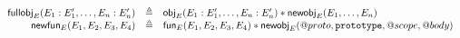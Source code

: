 \documentclass[a4paper]{article}
\begin{document}
%
%

\begin{displaymath}
  \begin{array}{rcl}
  \mathsf{fullobj}_{E}(E_1:E_1',\dots,E_n:E_n') &\triangleq& \mathsf{obj}_{E}(E_1:E_1',\dots,E_n:E_n') \mathbin{*} \mathsf{newobj}_{E}(E_1,\dots,E_n) \\
  \mathsf{newfun}_{E}(E_1,E_2,E_3,E_4) &\triangleq& \mathsf{fun}_{E}(E_1,E_2,E_3,E_4) \mathbin{*} \mathsf{newobj}_{E}(@proto, \mbox{\texttt{{\upshape prototype}}}, @scope, @body)
\end{array}
\end{displaymath}
\end{document}
